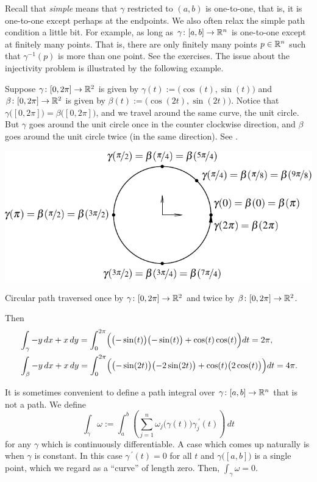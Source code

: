 Recall that \emph{simple} means that $\gamma$ restricted to $(a,b)$ is
one-to-one, that is, it is one-to-one except perhaps at the endpoints.
We also often relax the simple path condition a little bit.
For example, as long as
$\gamma \colon [a,b] \to {\mathbb{R}}^n$ is one-to-one except at finitely many points.  That
is, there are only finitely many points $p \in {\mathbb{R}}^n$ such that
$\gamma^{-1}(p)$ is more than one point.  See the exercises.  The issue about the
injectivity
problem is illustrated by the following example.

\begin{example}
Suppose $\gamma \colon [0,2\pi] \to {\mathbb{R}}^2$ is given by $\gamma(t) :=
\bigl(\cos(t),\sin(t)\bigr)$ and
$\beta \colon [0,2\pi] \to {\mathbb{R}}^2$ is given by $\beta(t) :=
\bigl(\cos(2t),\sin(2t)\bigr)$.  Notice that
$\gamma\bigl([0,2\pi]\bigr) = \beta\bigl([0,2\pi]\bigr)$, and we travel
around the same curve, the unit circle.  But $\gamma$ goes around the unit
circle once in the counter clockwise direction, and $\beta$ goes around the
unit circle twice (in the same direction). 
See .
\begin{myfigureht}
\includegraphics{figures/circlepathrepar2}
\caption{Circular path traversed once by
$\gamma \colon [0,2\pi] \to {\mathbb{R}}^2$
and twice by
$\beta \colon [0,2\pi] \to {\mathbb{R}}^2$.\label{fig:circlepathrepar2}}
\end{myfigureht}

Then
\begin{align*}
& \int_{\gamma} -y\, dx + x\,dy
=
\int_0^{2\pi}
\Bigl( \bigl(-\sin(t) \bigr) \bigl(-\sin(t) \bigr) + \cos(t) \cos(t) \Bigr) dt
=
2 \pi,\\
& \int_{\beta} -y\, dx + x\,dy
=
\int_0^{2\pi}
\Bigl( \bigl(-\sin(2t) \bigr) \bigl(-2\sin(2t) \bigr) + \cos(t)
\bigl(2\cos(t)\bigr) \Bigr) dt
=
4 \pi.
\end{align*}
\end{example}

It is sometimes convenient to define a path integral over $\gamma \colon
[a,b] \to {\mathbb{R}}^n$ that is not a path.
We define
\begin{equation*}
\int_{\gamma} \omega := \int_a^b
\left(
\sum_{j=1}^n
\omega_j\bigl(\gamma(t)\bigr) \gamma_j^{\:\prime}(t)
\right) \, dt 
\end{equation*}
for any $\gamma$ which is continuously differentiable.  A 
case which comes up naturally is when $\gamma$ is constant.  In this case
$\gamma^{\:\prime}(t) = 0$ for all $t$ and $\gamma\bigl([a,b]\bigr)$ is a single
point, which we regard as a ``curve'' of length zero.  Then,
$\int_{\gamma} \omega = 0$.


